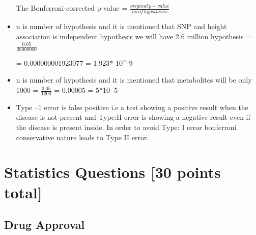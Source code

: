 \documentclass{article}
\begin{document}
\begin{itemize}


\begin{tcolorbox} 
   The Bonferroni-corrected p-value = ${\displaystyle\frac {original\,p-value}{no\,of\,hypothesis} }$
\end{tcolorbox}
\newline
\item  n is number of hypothesis and it is mentioned that SNP and height association is independent hypothesis we will have 2.6 million hypothesis = ${\displaystyle\frac{0.05}{26000000}}$
    
    \newline
    \newline = 0.000000001923077 
    \newline
    \newline = 1.923* 10^-9
\newline
\break
\item  n is number of hypothesis and it is mentioned that metabolites will be only 1000 
\newline = ${\displaystyle\frac{0.05}{1000}}$ 
\newline
\newline = 0.00005 
\newline
\newline = 5*10$^-5$

\newline

\break

\item Type –1 error is false positive i.e a test showing a positive result when the disease is not present and Type:II error is showing a negative result even if the disease is present inside. In order to avoid Type: I error bonferroni conservative nature leads to Type II error.

\end{itemize}

\section{Statistics Questions [30 points total]}
\subsection {Drug Approval}
\end{document}
